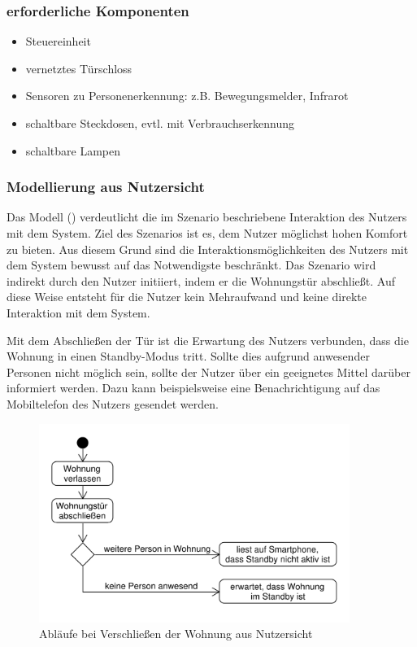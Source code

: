 \subsubsection{erforderliche Komponenten}
\begin{itemize}
	\item Steuereinheit
	\item vernetztes Türschloss
	\item Sensoren zu Personenerkennung: z.B. Bewegungsmelder, Infrarot
	\item schaltbare Steckdosen, evtl. mit Verbrauchserkennung
	\item schaltbare Lampen
\end{itemize}


\subsubsection{Modellierung aus Nutzersicht}
Das Modell () verdeutlicht die im Szenario beschriebene Interaktion des Nutzers mit dem System. Ziel des Szenarios ist es, dem Nutzer möglichst hohen Komfort zu bieten. Aus diesem Grund sind die Interaktionsmöglichkeiten des Nutzers mit dem System bewusst auf das Notwendigste beschränkt. Das Szenario wird indirekt durch den Nutzer initiiert, indem er die Wohnungstür abschließt. Auf diese Weise entsteht für die Nutzer kein Mehraufwand und keine direkte Interaktion mit dem System.

Mit dem Abschließen der Tür ist die Erwartung des Nutzers verbunden, dass die Wohnung in einen Standby-Modus tritt. Sollte dies aufgrund anwesender Personen nicht möglich sein, sollte der Nutzer über ein geeignetes Mittel darüber informiert werden. Dazu kann beispielsweise eine Benachrichtigung auf das Mobiltelefon des Nutzers gesendet werden.

\begin{figure}[h!]
	\centering
	\includegraphics[width=0.9\textwidth]{img/Szenarien/WohnungSchliessenNutzersicht.pdf}
	\caption{Abläufe bei Verschließen der Wohnung aus Nutzersicht}
	\label{fig:szenarienStandbyNutzersicht}
\end{figure}

